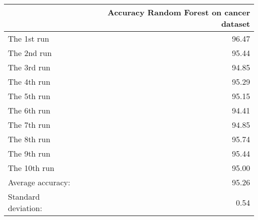 \begin{tabular}{lr}
\toprule
{} &  Accuracy Random Forest on cancer dataset \\
\midrule
The 1st run         &                                     96.47 \\
The 2nd run         &                                     95.44 \\
The 3rd run         &                                     94.85 \\
The 4th run         &                                     95.29 \\
The 5th run         &                                     95.15 \\
The 6th run         &                                     94.41 \\
The 7th run         &                                     94.85 \\
The 8th run         &                                     95.74 \\
The 9th run         &                                     95.44 \\
The 10th run        &                                     95.00 \\
Average accuracy:   &                                     95.26 \\
Standard deviation: &                                      0.54 \\
\bottomrule
\end{tabular}
